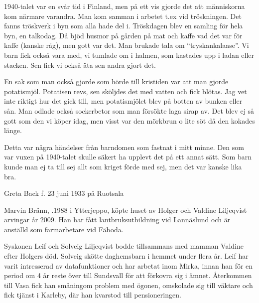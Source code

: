 1940-talet var en svår tid i Finland, men på ett vis gjorde det att människorna kom närmare varandra. Man kom samman i arbetet t.ex vid tröskningen. Det fanns tröskverk i byn som alla hade del i. Tröskdagen blev en samling för hela byn, en talkodag. Då bjöd husmor på gården på mat och kaffe vad det var för kaffe (kanske råg), men gott var det. Man brukade tala om ``tryskankalaase''. Vi barn fick också vara med, vi tumlade om i halmen, som kastades upp i ladan eller stacken. Sen fick vi också äta sen andra gjort det.

En sak som man också gjorde som hörde till kristiden var att man gjorde potatismjöl. Potatisen revs, sen sköljdes det med vatten och fick blötas. Jag vet inte riktigt hur det gick till, men potatismjölet blev på botten av bunken eller sån. Man odlade också sockerbetor som man försökte laga sirap av. Det blev ej så gott som den vi köper idag, men visst var den mörkbrun o lite söt då den kokades länge.

Detta var några händelser från barndomen som fastnat i mitt minne. Den som var vuxen på 1940-talet skulle säkert ha upplevt det på ett annat sätt. Som barn kunde man ej ta till sej allt som kriget förde med sej, men det var kanske lika bra.

Greta Back f. 23 juni 1933 på Ruotsala



%



%
Marvin Bränn, .1988 i Ytterjeppo, köpte huset av Holger och Valdine Liljeqvist arvingar år 2009. Han har fått lantbruksutbildning vid Lannäslund och är anställd som farmarbetare vid Fäboda.\jhvspace{}


%
Syskonen Leif och Solveig Liljeqvist bodde tillsammans med mamman  Valdine efter Holgers död. Solveig skötte daghemsbarn i hemmet under flera år. Leif har varit intresserad av datafunktioner och har arbetat inom Mirka, innan han för en period om 4 år reste över till Sundsvall för att förkovra sig i ämnet. Återkommen till Vasa fick han småningom problem med ögonen, omskolade sig till väktare och fick tjänst i Karleby, där han kvarstod till pensioneringen.



